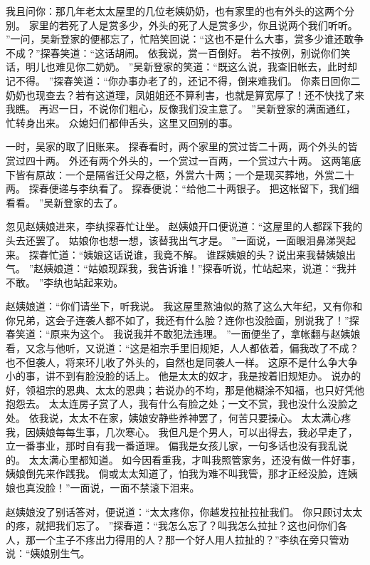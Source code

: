 我且问你：那几年老太太屋里的几位老姨奶奶，也有家里的也有外头的这两个分别。
家里的若死了人是赏多少，外头的死了人是赏多少，你且说两个我们听听。
”一问，吴新登家的便都忘了，忙陪笑回说：“这也不是什么大事，赏多少谁还敢争不成？”探春笑道：“这话胡闹。
依我说，赏一百倒好。
若不按例，别说你们笑话，明儿也难见你二奶奶。
”吴新登家的笑道：“既这么说，我查旧帐去，此时却记不得。
”探春笑道：“你办事办老了的，还记不得，倒来难我们。
你素日回你二奶奶也现查去？若有这道理，凤姐姐还不算利害，也就是算宽厚了！还不快找了来我瞧。
再迟一日，不说你们粗心，反像我们没主意了。
”吴新登家的满面通红，忙转身出来。
众媳妇们都伸舌头，这里又回别的事。
\par
一时，吴家的取了旧账来。
探春看时，两个家里的赏过皆二十两，两个外头的皆赏过四十两。
外还有两个外头的，一个赏过一百两，一个赏过六十两。
这两笔底下皆有原故：一个是隔省迁父母之柩，外赏六十两；一个是现买葬地，外赏二十两。
探春便递与李纨看了。
探春便说：“给他二十两银子。
把这帐留下，我们细看看。
”吴新登家的去了。
\par
忽见赵姨娘进来，李纨探春忙让坐。
赵姨娘开口便说道：“这屋里的人都踩下我的头去还罢了。
姑娘你也想一想，该替我出气才是。
”一面说，一面眼泪鼻涕哭起来。
探春忙道：“姨娘这话说谁，我竟不解。
谁踩姨娘的头？说出来我替姨娘出气。
”赵姨娘道：“姑娘现踩我，我告诉谁！”探春听说，忙站起来，说道：“我并不敢。
”李纨也站起来劝。
\par
赵姨娘道：“你们请坐下，听我说。
我这屋里熬油似的熬了这么大年纪，又有你和你兄弟，这会子连袭人都不如了，我还有什么脸？连你也没脸面，别说我了！”探春笑道：“原来为这个。
我说我并不敢犯法违理。
”一面便坐了，拿帐翻与赵姨娘看，又念与他听，又说道：“这是祖宗手里旧规矩，人人都依着，偏我改了不成？也不但袭人，将来环儿收了外头的，自然也是同袭人一样。
这原不是什么争大争小的事，讲不到有脸没脸的话上。
他是太太的奴才，我是按着旧规矩办。
说办的好，领祖宗的恩典、太太的恩典；若说办的不均，那是他糊涂不知福，也只好凭他抱怨去。
太太连房子赏了人，我有什么有脸之处；一文不赏，我也没什么没脸之处。
依我说，太太不在家，姨娘安静些养神罢了，何苦只要操心。
太太满心疼我，因姨娘每每生事，几次寒心。
我但凡是个男人，可以出得去，我必早走了，立一番事业，那时自有我一番道理。
偏我是女孩儿家，一句多话也没有我乱说的。
太太满心里都知道。
如今因看重我，才叫我照管家务，还没有做一件好事，姨娘倒先来作践我。
倘或太太知道了，怕我为难不叫我管，那才正经没脸，连姨娘也真没脸！”一面说，一面不禁滚下泪来。
\par
赵姨娘没了别话答对，便说道：“太太疼你，你越发拉扯拉扯我们。
你只顾讨太太的疼，就把我们忘了。
”探春道：“我怎么忘了？叫我怎么拉扯？这也问你们各人，那一个主子不疼出力得用的人？那一个好人用人拉扯的？”李纨在旁只管劝说：“姨娘别生气。
